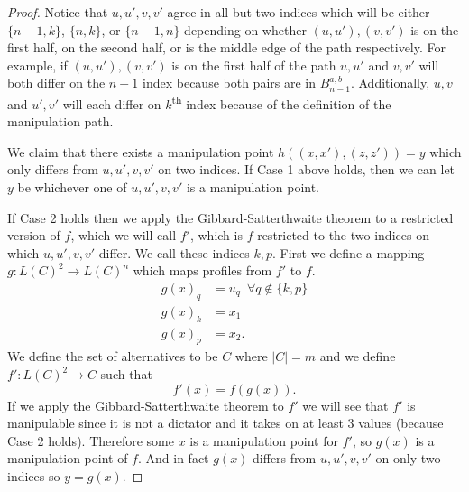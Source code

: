 \begin{proof}
		Notice that $u, u', v, v'$ agree in all but two indices which will be either $\{n - 1, k\}$, $\{n, k\}$, or $\{n - 1, n\}$ depending on whether $(u, u'), (v, v')$ is on the first half, on the second half, or is the middle edge of the path respectively. For example, if $(u, u'), (v, v')$ is on the first half of the path $u, u'$ and $v, v'$ will both differ on the $n - 1$ index because both pairs are in $B^{a,b}_{n-1}$. Additionally, $u, v$ and $u', v'$ will each differ on $k$\textsuperscript{th} index because of the definition of the manipulation path.

		We claim that there exists a manipulation point $h((x, x'), (z, z')) = y$ which only differs from $u, u', v, v'$ on two indices. If Case 1 above holds, then we can let $y$ be whichever one of $u, u', v, v'$ is a manipulation point.

		If Case 2 holds then we apply the Gibbard-Satterthwaite theorem to a restricted version of $f$, which we will call $f'$, which is $f$ restricted to the two indices on which $u, u', v, v'$ differ. We call these indices $k, p$. First we define a mapping $g : L(C)^2 \rightarrow L(C)^n$ which maps profiles from $f'$ to $f$.
		\begin{align*}
			g(x)_q &= u_q \,\,\, \forall q \notin \{k, p\} \\
			g(x)_k &= x_1 \\
			g(x)_p &= x_2.
		\end{align*}
		We define the set of alternatives to be $C$ where $|C| = m$ and we define $f' : L(C)^2 \rightarrow C$ such that
		\[
			f'(x) = f(g(x)).
		\]
		If we apply the Gibbard-Satterthwaite theorem \cite{gibbard1973manipulation, satterthwaite1975strategy} to $f'$ we will see that $f'$ is manipulable since it is not a dictator and it takes on at least 3 values (because Case 2 holds). Therefore some $x$ is a manipulation point for $f'$, so $g(x)$ is a manipulation point of $f$. And in fact $g(x)$ differs from $u, u', v, v'$ on only two indices so $y = g(x)$.


\end{proof}
